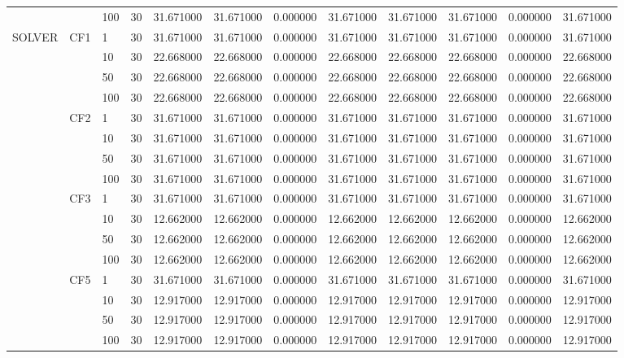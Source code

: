 \begin{tabular}{lllrrrrrrrrr}
 &  & 100 & 30 & 31.671000 & 31.671000 & 0.000000 & 31.671000 & 31.671000 & 31.671000 & 0.000000 & 31.671000 \\
\cline{1-12} \cline{2-12}
\multirow[t]{16}{*}{SOLVER} & \multirow[t]{4}{*}{CF1} & 1 & 30 & 31.671000 & 31.671000 & 0.000000 & 31.671000 & 31.671000 & 31.671000 & 0.000000 & 31.671000 \\
 &  & 10 & 30 & 22.668000 & 22.668000 & 0.000000 & 22.668000 & 22.668000 & 22.668000 & 0.000000 & 22.668000 \\
 &  & 50 & 30 & 22.668000 & 22.668000 & 0.000000 & 22.668000 & 22.668000 & 22.668000 & 0.000000 & 22.668000 \\
 &  & 100 & 30 & 22.668000 & 22.668000 & 0.000000 & 22.668000 & 22.668000 & 22.668000 & 0.000000 & 22.668000 \\
\cline{2-12}
 & \multirow[t]{4}{*}{CF2} & 1 & 30 & 31.671000 & 31.671000 & 0.000000 & 31.671000 & 31.671000 & 31.671000 & 0.000000 & 31.671000 \\
 &  & 10 & 30 & 31.671000 & 31.671000 & 0.000000 & 31.671000 & 31.671000 & 31.671000 & 0.000000 & 31.671000 \\
 &  & 50 & 30 & 31.671000 & 31.671000 & 0.000000 & 31.671000 & 31.671000 & 31.671000 & 0.000000 & 31.671000 \\
 &  & 100 & 30 & 31.671000 & 31.671000 & 0.000000 & 31.671000 & 31.671000 & 31.671000 & 0.000000 & 31.671000 \\
\cline{2-12}
 & \multirow[t]{4}{*}{CF3} & 1 & 30 & 31.671000 & 31.671000 & 0.000000 & 31.671000 & 31.671000 & 31.671000 & 0.000000 & 31.671000 \\
 &  & 10 & 30 & 12.662000 & 12.662000 & 0.000000 & 12.662000 & 12.662000 & 12.662000 & 0.000000 & 12.662000 \\
 &  & 50 & 30 & 12.662000 & 12.662000 & 0.000000 & 12.662000 & 12.662000 & 12.662000 & 0.000000 & 12.662000 \\
 &  & 100 & 30 & 12.662000 & 12.662000 & 0.000000 & 12.662000 & 12.662000 & 12.662000 & 0.000000 & 12.662000 \\
\cline{2-12}
 & \multirow[t]{4}{*}{CF5} & 1 & 30 & 31.671000 & 31.671000 & 0.000000 & 31.671000 & 31.671000 & 31.671000 & 0.000000 & 31.671000 \\
 &  & 10 & 30 & 12.917000 & 12.917000 & 0.000000 & 12.917000 & 12.917000 & 12.917000 & 0.000000 & 12.917000 \\
 &  & 50 & 30 & 12.917000 & 12.917000 & 0.000000 & 12.917000 & 12.917000 & 12.917000 & 0.000000 & 12.917000 \\
 &  & 100 & 30 & 12.917000 & 12.917000 & 0.000000 & 12.917000 & 12.917000 & 12.917000 & 0.000000 & 12.917000 \\
\cline{1-12} \cline{2-12}
\bottomrule
\end{tabular}
